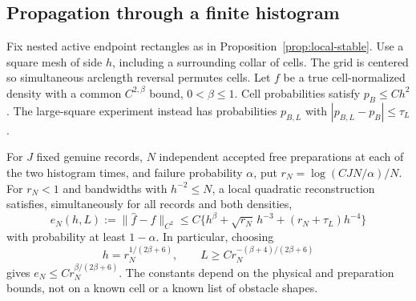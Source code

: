 \subsection{Propagation through a finite histogram}
Fix nested active endpoint rectangles as in Proposition~\ref{prop:local-stable}.
Use a square mesh of side $h$, including a surrounding collar of cells.
The grid is centered so simultaneous arclength reversal permutes cells.
Let $f$ be a true cell-normalized density with a common
$C^{2,\beta}$ bound, $0<\beta\le1$. Cell probabilities satisfy
$p_B\le C h^2$. The large-square experiment instead has probabilities
$p_{B,L}$ with $|p_{B,L}-p_B|\le\tau_L$.

\begin{lemma}
\label{lem:biased-histogram}
For $J$ fixed genuine records, $N$ independent accepted free preparations
at each of the two histogram times, and failure probability $\alpha$,
put $r_N=\log(CJN/\alpha)/N$. For $r_N<1$ and bandwidths with
$h^{-2}\le N$, a local quadratic reconstruction satisfies, simultaneously
for all records and both densities,
\begin{equation}\label{eq:biased-rate}
 e_N(h,L):=\|\widehat f-f\|_{C^2}
 \le C\{h^\beta+\sqrt{r_N}\,h^{-3}
                       +(r_N+\tau_L)h^{-4}\}
\end{equation}
with probability at least $1-\alpha$. In particular, choosing
\begin{equation}\label{eq:box-bandwidth}
 h=r_N^{1/(2\beta+6)},\qquad
 L\ge C r_N^{-(\beta+4)/(2\beta+6)}
\end{equation}
gives $e_N\le C r_N^{\beta/(2\beta+6)}$. The constants depend on
the physical and preparation bounds, not on a known cell or a known list
of obstacle shapes.
\end{lemma}
